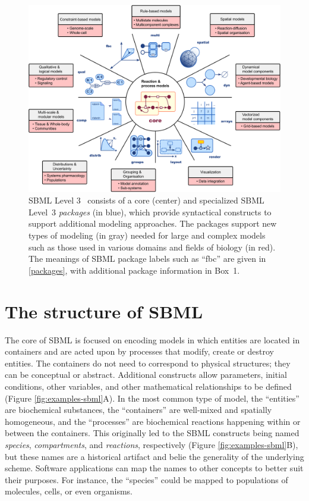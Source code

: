 \documentclass{sbml-paper}
\begin{document}
\begin{figure}[b]
  \center
  \includegraphics[width=\textwidth]{resources/SBML-Level3-v12.pdf}
\caption{SBML Level 3~\citep{Hucka2019systems} consists of a core (center) and specialized SBML Level~3 \emph{packages} (in blue), which provide syntactical constructs to support additional modeling approaches. The packages support new types of modeling (in gray) needed for large and complex models such as those used in various domains and fields of biology (in red). The meanings of SBML package labels such as ``fbc'' are given in \autoref{packages}, with additional package information in Box~1.}
\label{level-3-diagram}
\end{figure}

\clearpage
\newpage

\section*{The structure of SBML}
\label{sec:sbml}

The core of SBML is focused on encoding models in which entities are located in containers and are acted upon by processes that modify, create or destroy entities.  The containers do not need to correspond to physical structures; they can be conceptual or abstract.  Additional constructs allow parameters, initial conditions, other variables, and other mathematical relationships to be defined (Figure \ref{fig:examples-sbml}A).  In the most common type of model, the ``entities'' are biochemical substances, the ``containers'' are well-mixed and spatially homogeneous, and the ``processes'' are biochemical reactions happening within or between the containers.  This originally led to the SBML constructs being named \emph{species}, \emph{compartments}, and \emph{reactions}, respectively (Figure \ref{fig:examples-sbml}B), but these names are a historical artifact and belie the generality of the underlying scheme.  Software applications can map the names to other concepts to better suit their purposes.  For instance, the ``species'' could be mapped to populations of molecules, cells, or even organisms.
\end{document}
